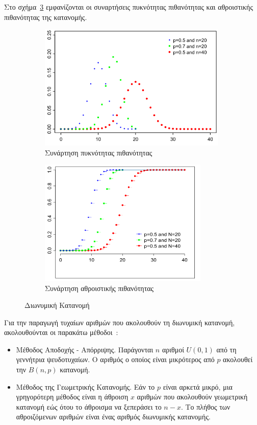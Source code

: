 \documentclass[12pt]{report}
\begin{document}
Στο σχήμα~\ref{fig:Binom_Dist} εμφανίζονται οι συναρτήσεις πυκνότητας πιθανότητας και αθροιστικής πιθανότητας της κατανομής.
\begin{figure}[h]
\begin{subfigure}{0.5\textwidth}
\includegraphics[width=1.0\linewidth, height=6cm]{bin_dist_pmf} 
\caption{Συνάρτηση πυκνότητας πιθανότητας}
\label{fig:Binom_Dist_PMF}
\end{subfigure}
\begin{subfigure}{0.5\textwidth}
\includegraphics[width=1.0\linewidth, height=6cm]{bin_dist_cdf}
\caption{Συνάρτηση αθροιστικής πιθανότητας}
\label{fig:Binom_Dist_CDF}
\end{subfigure}
 
\caption{Διωνυμική Κατανομή}
\label{fig:Binom_Dist}
\end{figure}

Για την παραγωγή τυχαίων αριθμών που ακολουθούν τη διωνυμική κατανομή, ακολουθούνται οι παρακάτω μέθοδοι~\cite{book:07}:
\begin{itemize}
  \item Μέθοδος Αποδοχής - Απόρριψης. Παράγονται \(n\) αριθμοί \(U(0, 1)\) από τη γεννήτρια ψευδοτυχαίων. Ο αριθμός ο οποίος είναι μικρότερος από \(p\) ακολουθεί την \(B(n, p)\) κατανομή.
  \item Μέθοδος της Γεωμετρικής Κατανομής. Εάν το \(p\) είναι αρκετά μικρό, μια γρηγορότερη μέθοδος είναι η άθροιση \(x\) αριθμών που ακολουθούν γεωμετρική κατανομή εώς ότου το άθροισμα να ξεπεράσει το \(n-x\). Το πλήθος των αθροιζόμενων αριθμών είναι ένας αριθμός διωνυμικής κατανομής.
\end{itemize}
\end{document}
